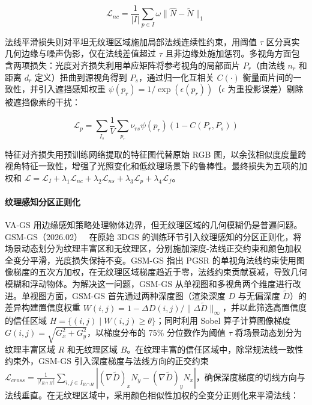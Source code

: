 \begin{equation}
\mathcal{L}_{nc} = \frac{1}{|I|} \sum_{p \in I} \omega \| \hat{N} - \tilde{N} \|_1
\end{equation}

法线平滑损失则对平坦无纹理区域施加局部法线连续性约束，用阈值 $\tau$ 区分真实几何边缘与噪声伪影，仅在法线差值超过 $\tau$ 且非边缘处施加惩罚。多视角方面包含两项损失：光度对齐损失利用单应矩阵将参考视角的局部面片 $P_r$（由法线 $n_r$ 和距离 $d_r$ 定义）扭曲到源视角得到 $P_s$，通过归一化互相关 $C(\cdot)$ 衡量面片间的一致性，并引入遮挡感知权重 $\psi(p_r) = 1/\exp(\epsilon(p_r))$（$\epsilon$ 为重投影误差）剔除被遮挡像素的干扰：

\begin{equation}
\mathcal{L}_p = \sum_{I_s} \frac{1}{V} \sum_{p_r} \nu_{rs} \psi(p_r) (1 - C(P_r, P_s))
\end{equation}

特征对齐损失用预训练网络提取的特征图代替原始 RGB 图，以余弦相似度度量跨视角特征一致性，增强了光照变化和低纹理场景下的鲁棒性。最终损失为五项的加权和 $\mathcal{L} = \mathcal{L}_I + \lambda_1 \mathcal{L}_{nc} + \lambda_2 \mathcal{L}_{ns} + \lambda_3 \mathcal{L}_p + \lambda_4 \mathcal{L}_f$。

\paragraph{纹理感知分区正则化}

VA-GS 用边缘感知策略处理物体边界，但无纹理区域的几何模糊仍是普遍问题。GSM-GS（2026.02）~\cite{2602_12796} 在原始 3DGS 的训练环节引入纹理感知的分区正则化，将场景动态划分为纹理丰富区和无纹理区，分别施加深度-法线正交约束和颜色加权全变分平滑，光度损失保持不变。GSM-GS 指出 PGSR 的单视角法线约束使用图像梯度的五次方加权，在无纹理区域梯度趋近于零，法线约束贡献衰减，导致几何模糊和浮动物体。为解决这一问题，GSM-GS 从单视图和多视角两个维度进行改进。单视图方面，GSM-GS 首先通过两种深度图（渲染深度 $D$ 与无偏深度 $\tilde{D}$）的差异构建置信度权重 $W(i,j) = 1 - \Delta D(i,j)/\|\Delta \tilde{D}\|_{\infty}$，并以此筛选高置信度的信任区域 $H = \{(i,j) \mid W(i,j) \geq \theta\}$；同时利用 Sobel 算子计算图像梯度 $G(i,j) = \sqrt{G_x^2 + G_y^2}$，以梯度分布的 75\% 分位数作为阈值 $\tau$ 将场景动态划分为纹理丰富区域 $R$ 和无纹理区域 $B$。在纹理丰富的信任区域中，除常规法线一致性约束外，GSM-GS 引入深度梯度与法线方向的正交约束 $\mathcal{L}_{cross} = \frac{1}{|I_{R \cap H}|} \sum_{i,j \in I_{R \cap H}} |(\nabla \tilde{D})_x N_y - (\nabla \tilde{D})_y N_x|$，确保深度梯度的切线方向与法线垂直。在无纹理区域中，采用颜色相似性加权的全变分正则化来平滑法线：

